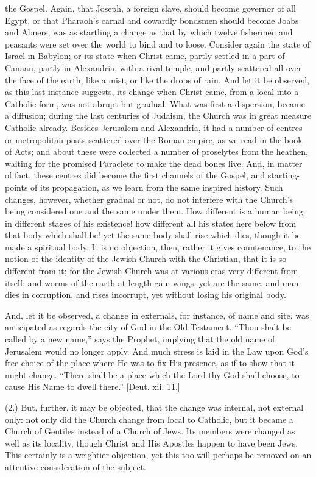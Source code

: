 the Gospel. Again, that Joseph, a foreign slave, should become
governor of all Egypt, or that Pharaoh's carnal and cowardly bondsmen
should become Joabs and Abners, was as startling a change as that by
which twelve fishermen and peasants were set over the world to bind
and to loose. Consider again the state of Israel in Babylon; or its
state when Christ came, partly settled in a part of Canaan, partly in
Alexandria, with a rival temple, and partly scattered all over the
face of the earth, like a mist, or like the drops of rain. And let it
be observed, as this last instance suggests, its change when Christ
came, from a local into a Catholic form, was not abrupt but gradual.
What was first a dispersion, became a diffusion; during the last
centuries of Judaism, the Church was in great measure Catholic
already. Besides Jerusalem and Alexandria, it had a number of centres
or metropolitan posts scattered over the Roman empire, as we read in
the book of Acts; and about these were collected a number of
proselytes from the heathen, waiting for the promised Paraclete to
make the dead bones live. And, in matter of fact, these centres did
become the first channels of the Gospel, and starting-points of its
propagation, as we learn from the same inspired history. Such changes,
however, whether gradual or not, do not interfere with the Church's
being considered one and the same under them. How different is a human
being in different stages of his existence! how different all his
states here below from that body which shall be! yet the same body
shall rise which dies, though it be made a spiritual body. It is no
objection, then, rather it gives countenance, to the notion of the
identity of the Jewish Church with the Christian, that it is so
different from it; for the Jewish Church was at various eras very
different from itself; and worms of the earth at length gain wings,
yet are the same, and man dies in corruption, and rises incorrupt, yet
without losing his original body.

And, let it be observed, a change in externals, for instance, of
name and site, was anticipated as regards the city of God in the Old
Testament. ``Thou shalt be called by a new name,'' says the
Prophet, implying that the old name of Jerusalem would no longer
apply. And much stress is laid in the Law upon God's free choice of
the place where He was to fix His presence, as if to show that it
might change. ``There shall be a place which the Lord thy God
shall choose, to cause His Name to dwell there.'' [Deut. xii. 11.]

(2.) But, further, it may be objected, that the change was
internal, not external only: not only did the Church change from local
to Catholic, but it became a Church of Gentiles instead of a Church of
Jews. Its members were changed as well as its locality, though Christ
and His Apostles happen to have been Jews. This certainly is a
weightier objection, yet this too will perhaps be removed on an
attentive consideration of the subject.

